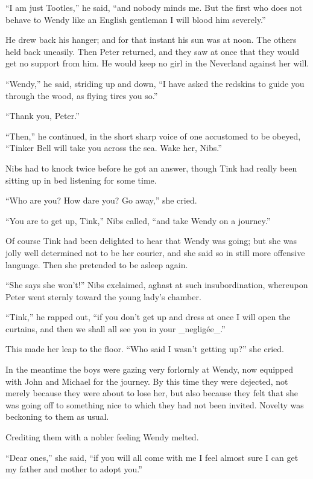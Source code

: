 ``I am just Tootles,'' he said, ``and nobody minds me. But the first who
does not behave to Wendy like an English gentleman I will blood him
severely.''

He drew back his hanger; and for that instant his sun was at noon. The
others held back uneasily. Then Peter returned, and they saw at once
that they would get no support from him. He would keep no girl in the
Neverland against her will.

``Wendy,'' he said, striding up and down, ``I have asked the redskins to
guide you through the wood, as flying tires you so.''

``Thank you, Peter.''

``Then,'' he continued, in the short sharp voice of one accustomed to be
obeyed, ``Tinker Bell will take you across the sea. Wake her, Nibs.''

Nibs had to knock twice before he got an answer, though Tink had really
been sitting up in bed listening for some time.

``Who are you? How dare you? Go away,'' she cried.

``You are to get up, Tink,'' Nibs called, ``and take Wendy on a journey.''

Of course Tink had been delighted to hear that Wendy was going; but she
was jolly well determined not to be her courier, and she said so in
still more offensive language. Then she pretended to be asleep again.

``She says she won't!'' Nibs exclaimed, aghast at such insubordination,
whereupon Peter went sternly toward the young lady's chamber.

``Tink,'' he rapped out, ``if you don't get up and dress at once I will
open the curtains, and then we shall all see you in your _negligée_.''

This made her leap to the floor. ``Who said I wasn't getting up?'' she
cried.

In the meantime the boys were gazing very forlornly at Wendy, now
equipped with John and Michael for the journey. By this time they were
dejected, not merely because they were about to lose her, but also
because they felt that she was going off to something nice to which
they had not been invited. Novelty was beckoning to them as usual.

Crediting them with a nobler feeling Wendy melted.

``Dear ones,'' she said, ``if you will all come with me I feel almost sure
I can get my father and mother to adopt you.''

